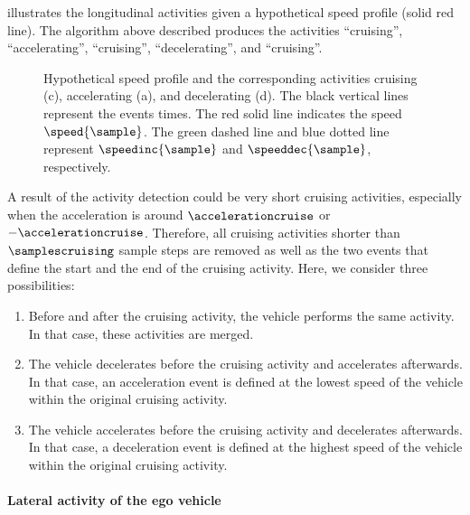  illustrates the longitudinal activities given a hypothetical speed profile (solid red line). The algorithm above described produces the activities ``cruising'', ``accelerating'', ``cruising'', ``decelerating'', and ``cruising''.

\setlength{\figurewidth}{\linewidth}
\setlength{\figureheight}{0.7\linewidth}
\begin{figure}
	\centering
	
	\caption{Hypothetical speed profile and the corresponding activities cruising (c), accelerating (a), and decelerating (d). The black vertical lines represent the events times. The red solid line indicates the speed $\speed{\sample}$. The green dashed line and blue dotted line represent $\speedinc{\sample}$ and $\speeddec{\sample}$, respectively.}
	\label{fig:longitudinal activities}
\end{figure}

A result of the activity detection could be very short cruising activities, especially when the acceleration is around $\accelerationcruise$ or $-\accelerationcruise$. 
Therefore, all cruising activities shorter than $\samplescruising$ sample steps are removed as well as the two events that define the start and the end of the cruising activity. 
Here, we consider three possibilities:
\begin{enumerate}
	\item Before and after the cruising activity, the vehicle performs the same activity. In that case, these activities are merged.
	\item The vehicle decelerates before the cruising activity and accelerates afterwards. In that case, an acceleration event is defined at the lowest speed of the vehicle within the original cruising activity.
	\item The vehicle accelerates before the cruising activity and decelerates afterwards. In that case, a deceleration event is defined at the highest speed of the vehicle within the original cruising activity.
\end{enumerate}



\paragraph{Lateral activity of the ego vehicle}
\label{sec:lateral ego}

